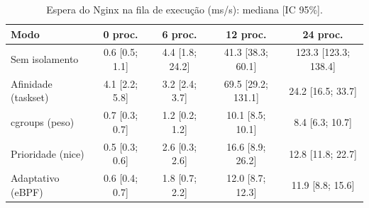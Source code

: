 \begin{table}[H]
\centering
\small
\caption{Espera do Nginx na fila de execução (ms/s): mediana [IC 95\%].}
\label{tab:espera}
\begin{tabular}{lcccc}
\toprule
\textbf{Modo} & \textbf{0 proc.} & \textbf{6 proc.} & \textbf{12 proc.} & \textbf{24 proc.} \\
\midrule
Sem isolamento & 0.6 [0.5; 1.1] & 4.4 [1.8; 24.2] & 41.3 [38.3; 60.1] & 123.3 [123.3; 138.4] \\
Afinidade (taskset) & 4.1 [2.2; 5.8] & 3.2 [2.4; 3.7] & 69.5 [29.2; 131.1] & 24.2 [16.5; 33.7] \\
cgroups (peso) & 0.7 [0.3; 0.7] & 1.2 [0.2; 1.2] & 10.1 [8.5; 10.1] & 8.4 [6.3; 10.7] \\
Prioridade (nice) & 0.5 [0.3; 0.6] & 2.6 [0.3; 2.6] & 16.6 [8.9; 26.2] & 12.8 [11.8; 22.7] \\
Adaptativo (eBPF) & 0.6 [0.4; 0.7] & 1.8 [0.7; 2.2] & 12.0 [8.7; 12.3] & 11.9 [8.8; 15.6] \\
\bottomrule
\end{tabular}
\end{table}
